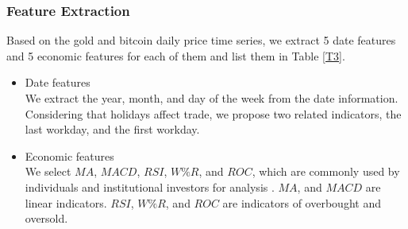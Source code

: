 \documentclass[12pt]{article}
\begin{document}
\subsubsection{Feature Extraction}
Based on the gold and bitcoin daily price time series, we extract 5 date features and 5 economic features for each of them and list them in Table \ref{T3}.
\begin{itemize}
\item Date features\\
We extract the year, month, and day of the week from the date information. Considering that holidays affect trade, we propose two related indicators, the last workday, and the first workday.
\item Economic features\\
We select $MA$, $MACD$, $RSI$, $W\%R$, and $ROC$, which are commonly used by individuals and institutional investors for analysis \cite{9}.  $MA$, and $MACD$ are linear indicators. $RSI$, $W\%R$, and $ROC$ are indicators of overbought and oversold.
\end{itemize}
\end{document}
